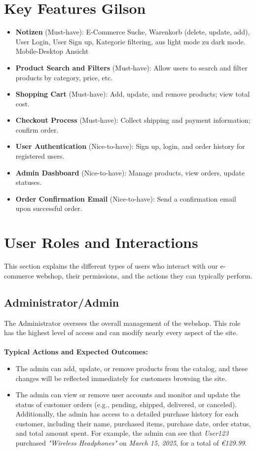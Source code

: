 \documentclass[a4paper,12pt]{article.cls}
\begin{document}
	\section{Key Features Gilson}
	\begin{itemize}
		\item \textbf{Notizen} (Must-have): E-Commerce
		Suche, Warenkorb (delete, update, add), User Login, User Sign up, Kategorie filtering, aus light mode zu dark mode. Mobile-Desktop Ansicht
		\item \textbf{Product Search and Filters} (Must-have): Allow users to search and filter products by category, price, etc.
		\item \textbf{Shopping Cart} (Must-have): Add, update, and remove products; view total cost.
		\item \textbf{Checkout Process} (Must-have): Collect shipping and payment information; confirm order.
		\item \textbf{User Authentication} (Nice-to-have): Sign up, login, and order history for registered users.
		\item \textbf{Admin Dashboard} (Nice-to-have): Manage products, view orders, update statuses.
		\item \textbf{Order Confirmation Email} (Nice-to-have): Send a confirmation email upon successful order.
	\end{itemize}
	

	\section{User Roles and Interactions}
	This section explains the different types of users who interact with our e-commerce webshop, their permissions, and the actions they can typically perform.
	\subsection*{Administrator/Admin}
	The Administrator oversees the overall management of the webshop. This role has the highest level of access and can modify nearly every aspect of the site. \\ \\
	\textbf{Typical Actions and Expected Outcomes:}
	\begin{itemize}
		\item The admin can add, update, or remove products from the catalog, and these changes will be reflected immediately for customers browsing the site.
		\item The admin can view or remove user accounts and monitor and update the status of customer orders (e.g., pending, shipped, delivered, or canceled). Additionally, the admin has access to a detailed purchase history for each customer, including their name, purchased items, purchase date, order status, and total amount spent. For example, the admin can see that \textit{User123} purchased  \textit{"Wireless Headphones"} on \textit{March 15, 2025}, for a total of \textit{\euro{}129.99}.
	\end{itemize}
\end{document}
